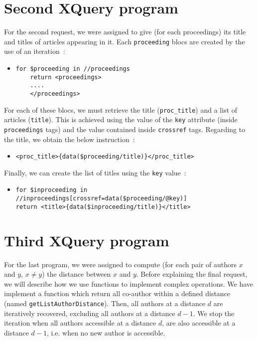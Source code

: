 \documentclass{article}
\begin{document}
\section{Second XQuery program}
  For the second request, we were assigned to give (for each proceedings) its title and titles of articles appearing in it. Each \verb|proceeding| blocs are created by the use of an iteration~:
  \begin{itemize}
    \item \begin{verbatim}
for $proceeding in //proceedings
    return <proceedings>
    ....
    </proceedings>\end{verbatim}
  \end{itemize}
  For each of these blocs, we must retrieve the title (\verb|proc_title|) and a list of articles (\verb|title|). This is achieved using the value of the \verb|key| attribute (inside \verb|proceedings| tags) and the value contained inside \verb|crossref| tags. Regarding to the title, we obtain the below instruction~:
  \begin{itemize}
    \item \verb|<proc_title>{data($proceeding/title)}</proc_title>|
  \end{itemize}
  Finally, we can create the list of titles using the \verb|key| value~:  
  \begin{itemize}
    \item \begin{verbatim}
for $inproceeding in //inproceedings[crossref=data($proceeding/@key)]
return <title>{data($inproceeding/title)}</title>\end{verbatim}
  \end{itemize}
  

\section{Third XQuery program}
  For the last program, we were assigned to compute (for each pair of authors $x$ and $y$, $x \neq y$) the distance between $x$ and $y$. Before explaining the final request, we will describe how we use functions to implement complex operations. We have implement a function which return all co-author within a defined distance (named \verb|getListAuthorDistance|). Then, all authors at a distance $d$ are iteratively recovered, excluding all authors at a distance $d-1$. We stop the iteration when all authors accessible at a distance $d$, are also accessible at a distance $d-1$, i.e. when no new author is accessible.
  
\end{document}
